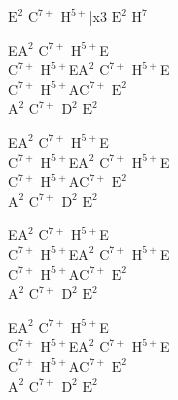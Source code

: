 \begin{chordw}
    \begin{footTwo}
    $\mathrm{E^{2}}$ $\mathrm{C^{7+}}$ $\mathrm{H^{5+}}$|x3 $\mathrm{E^{2}}$ $\mathrm{H^{7}}$

    E$\mathrm{A^{2}}$ $\mathrm{C^{7+}}$ $\mathrm{H^{5+}}$E\\
    $\mathrm{C^{7+}}$ $\mathrm{H^{5+}}$E$\mathrm{A^{2}}$ $\mathrm{C^{7+}}$ $\mathrm{H^{5+}}$E\\
    $\mathrm{C^{7+}}$ $\mathrm{H^{5+}}$A$\mathrm{C^{7+}}$ $\mathrm{E^{2}}$\\
    $\mathrm{A^{2}}$ $\mathrm{C^{7+}}$ $\mathrm{D^{2}}$ $\mathrm{E^{2}}$

    E$\mathrm{A^{2}}$ $\mathrm{C^{7+}}$ $\mathrm{H^{5+}}$E\\
    $\mathrm{C^{7+}}$ $\mathrm{H^{5+}}$E$\mathrm{A^{2}}$ $\mathrm{C^{7+}}$ $\mathrm{H^{5+}}$E\\
    $\mathrm{C^{7+}}$ $\mathrm{H^{5+}}$A$\mathrm{C^{7+}}$ $\mathrm{E^{2}}$\\
    $\mathrm{A^{2}}$ $\mathrm{C^{7+}}$ $\mathrm{D^{2}}$ $\mathrm{E^{2}}$

    E$\mathrm{A^{2}}$ $\mathrm{C^{7+}}$ $\mathrm{H^{5+}}$E\\
    $\mathrm{C^{7+}}$ $\mathrm{H^{5+}}$E$\mathrm{A^{2}}$ $\mathrm{C^{7+}}$ $\mathrm{H^{5+}}$E\\
    $\mathrm{C^{7+}}$ $\mathrm{H^{5+}}$A$\mathrm{C^{7+}}$ $\mathrm{E^{2}}$\\
    $\mathrm{A^{2}}$ $\mathrm{C^{7+}}$ $\mathrm{D^{2}}$ $\mathrm{E^{2}}$

    E$\mathrm{A^{2}}$ $\mathrm{C^{7+}}$ $\mathrm{H^{5+}}$E\\
    $\mathrm{C^{7+}}$ $\mathrm{H^{5+}}$E$\mathrm{A^{2}}$ $\mathrm{C^{7+}}$ $\mathrm{H^{5+}}$E\\
    $\mathrm{C^{7+}}$ $\mathrm{H^{5+}}$A$\mathrm{C^{7+}}$ $\mathrm{E^{2}}$\\
    $\mathrm{A^{2}}$ $\mathrm{C^{7+}}$ $\mathrm{D^{2}}$ $\mathrm{E^{2}}$
\end{footTwo}
\end{chordw}
